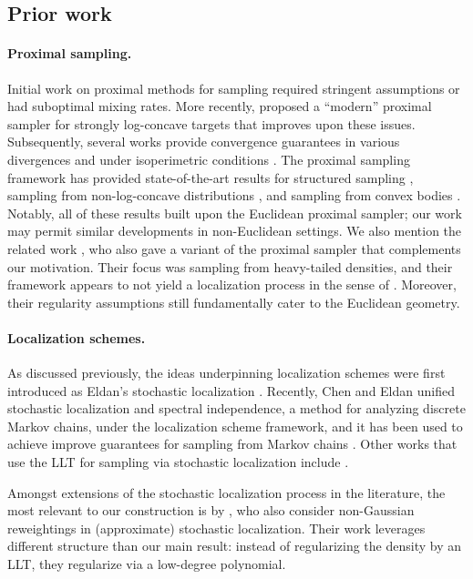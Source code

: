 \documentclass[11pt]{article}
\newcommand{\0}{\mathbf{0}}
\newcommand{\1}{\mathbf{1}}
\begin{document}
\subsection{Prior work}
\paragraph{Proximal sampling.} Initial work on proximal methods for sampling \cite{Pereyra16,BrosseDMP17,Bernton18,Wibisono19} required stringent assumptions or had suboptimal mixing rates. More recently, \cite{LeeST21} proposed a ``modern'' proximal sampler for strongly log-concave targets that improves upon these issues. Subsequently, several works provide convergence guarantees in various divergences and under isoperimetric conditions \cite{ChenCSW22,AltschulerC24,MitraW25,LiangMW25,Wibisono25}. The proximal sampling framework has provided state-of-the-art results for structured sampling \cite{LeeST21,GopLL22,LiangC22,FanYC23,YuanFLWC23}, sampling from non-log-concave distributions \cite{HeMBE24,HeLSZ25}, and sampling from convex bodies \cite{KookVZ24,KookV25a,KookV25b,Kook25}. Notably, all of these results built upon the Euclidean proximal sampler; our work may permit similar developments in non-Euclidean settings.
We also mention the related work \cite{HeHBE24}, who also gave a variant of the proximal sampler that complements our motivation. Their focus was sampling from heavy-tailed densities, and their framework appears to not yield a localization process in the sense of \cite{ChenE22}. Moreover, their regularity assumptions still fundamentally cater to the Euclidean geometry.

\paragraph{Localization schemes.} As discussed previously, the ideas underpinning localization schemes were first introduced as Eldan's stochastic localization \cite{Eldan13}. Recently, Chen and Eldan \cite{ChenE22} unified stochastic localization and spectral independence, a method for analyzing discrete Markov chains, under the localization scheme framework, and it has been used to achieve improve guarantees for sampling from Markov chains \cite{ElAlaouiMS22,BentonDDD24,HuangMP24,AnariKV24,HuangMRW25,ChenLYZ25}. Other works that use the LLT for sampling via stochastic localization include \cite{EldanS22,AnariHLVXY23}.

Amongst extensions of the stochastic localization process in the literature, the most relevant to our construction is by \cite{MikulincerP24}, who also consider non-Gaussian reweightings in (approximate) stochastic localization. Their work leverages different structure than our main result: instead of regularizing the density by an LLT, they regularize via a low-degree polynomial. 
\end{document}
